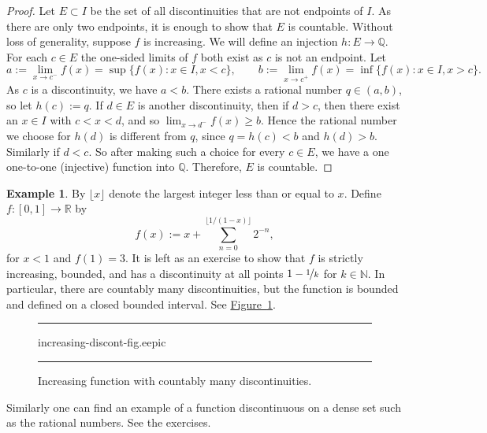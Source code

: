 \documentclass[12pt]{book}
\newenvironment{myfigureht}{%
\begin{figure}[h!t]
\noindent\rule{\textwidth}{0.4pt}\vspace{12pt}\par\centering}%
{\par\noindent\rule{\textwidth}{0.4pt}
\end{figure}}
\newcommand{\R}{{\mathbb{R}}}
\newcommand{\N}{{\mathbb{N}}}
\newcommand{\Q}{{\mathbb{Q}}}
\theoremstyle{plain}
\theoremstyle{remark}
\theoremstyle{definition}
\theoremstyle{exercise}
\theoremstyle{example}
\newtheorem{example}[thm]{Example}
\newcommand{\figureref}[1]{\hyperref[#1]{Figure~\ref*{#1}}}
\begin{document}
\begin{proof}
Let $E \subset I$ be the set of all discontinuities
that are not endpoints of $I$.  As there are
only two endpoints, it is enough to show that $E$ is countable.
Without loss of generality, suppose $f$ is increasing.
We will define an injection $h \colon E \to \Q$.
For each $c \in E$
the one-sided limits of $f$ both exist as $c$ is not an endpoint.
Let
\begin{equation*}
a := \lim_{x \to c^-} f(x) = \sup \{ f(x) : x \in I, x < c \} ,
\qquad
b := \lim_{x \to c^+} f(x) = \inf \{ f(x) : x \in I, x > c \} .
\end{equation*}
As $c$ is a discontinuity, we have $a < b$.  
There exists a rational number $q \in (a,b)$, so let $h(c) := q$.
If $d \in E$ is another discontinuity, then if $d > c$, then there
exist an $x \in I$ with $c < x < d$, and so $\lim_{x \to d^-} f(x) \geq b$.
Hence the rational number we choose for $h(d)$ is different from $q$,
since $q=h(c) < b$ and $h(d) > b$.
Similarly if $d < c$.  So after making such a choice for
every $c \in E$, we have a one
one-to-one (injective) function into $\Q$.  Therefore, $E$ is countable.
\end{proof}

\begin{example} \label{example:countdiscont}
By $\lfloor x \rfloor$ denote the largest integer less than or equal to $x$.
Define $f \colon [0,1] \to \R$ by
\begin{equation*}
f(x) :=
x +
\sum_{n=0}^{\lfloor 1/(1-x) \rfloor}
2^{-n} ,
\end{equation*}
for $x < 1$ and $f(1) = 3$.
It is left as an exercise to show that $f$ is strictly increasing, bounded, and
has a discontinuity at all points $1-\nicefrac{1}{k}$ for $k \in \N$.  In particular,
there are countably many discontinuities, but the function is bounded and
defined on a closed bounded interval.  See \figureref{fig:countdiscont}.
\begin{myfigureht}
{increasing-discont-fig.eepic}
\caption{Increasing function with countably many
discontinuities.\label{fig:countdiscont}}
\end{myfigureht}

Similarly one can find an example of a function discontinuous on a dense set
such as the rational numbers.  See the exercises.
\end{example}
\end{document}
